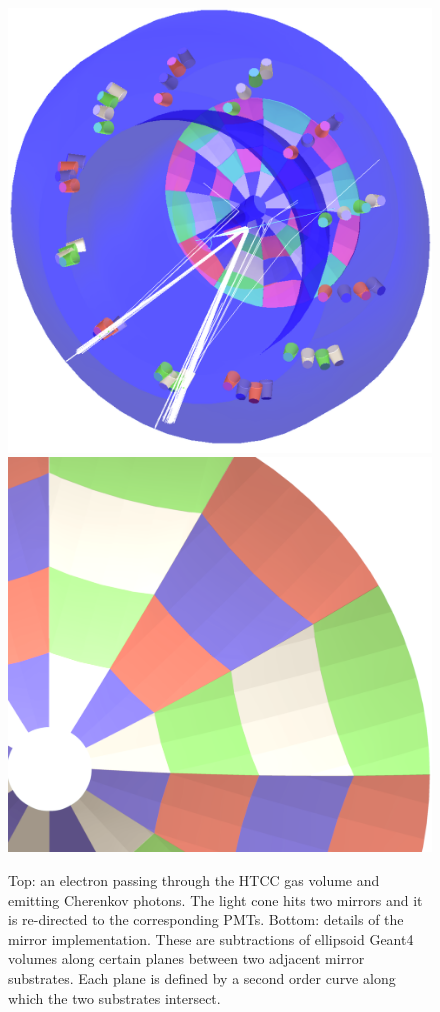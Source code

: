 \begin{figure}
	\centering
	\includegraphics[width=0.99\columnwidth,keepaspectratio]{img/htccGeometry.png}
	\includegraphics[width=0.99\columnwidth,keepaspectratio]{img/htccDetail.png}
	\caption{Top: an electron passing through the HTCC gas volume and emitting Cherenkov photons. The light cone
            hits two mirrors and it is re-directed to the corresponding PMTs.
            Bottom: details of the mirror implementation. These are subtractions of ellipsoid Geant4 volumes along
            certain planes between two adjacent mirror substrates. Each plane is defined by a second order
            curve along which the two substrates intersect.}
	\label{fig:htccGeometry}
\end{figure}


